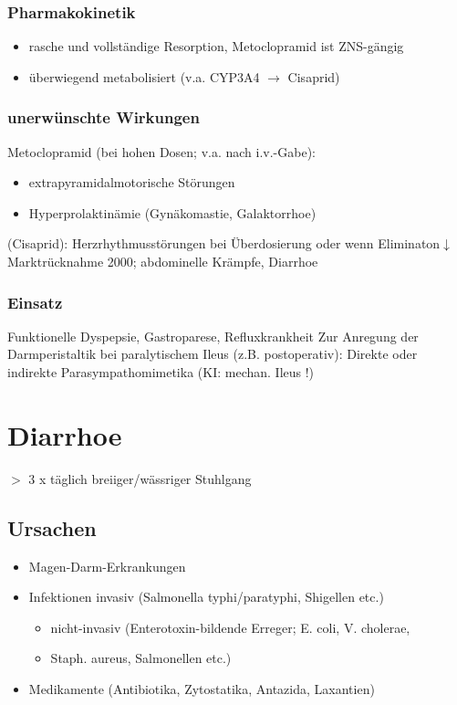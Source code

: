\documentclass[10pt,a4paper]{report}
\begin{document}
\subsubsection{Pharmakokinetik} %
\label{ssub:pharmakokinetik}
\begin{itemize}
	\item rasche und vollständige Resorption, Metoclopramid ist ZNS-gängig
	\item überwiegend metabolisiert (v.a. CYP3A4 $\rightarrow$ Cisaprid)
\end{itemize}
\subsubsection{unerwünschte Wirkungen} %
\label{ssub:unerw_nschte_wirkungen}
Metoclopramid (bei hohen Dosen; v.a. nach i.v.-Gabe): 
\begin{itemize}
	\item extrapyramidalmotorische Störungen
	\item Hyperprolaktinämie (Gynäkomastie, Galaktorrhoe)
\end{itemize}
(Cisaprid): Herzrhythmusstörungen bei Überdosierung oder wenn Eliminaton$\downarrow$
Marktrücknahme 2000; abdominelle Krämpfe, Diarrhoe  
\subsubsection{Einsatz} %
\label{ssub:einsatz}
Funktionelle Dyspepsie, Gastroparese, Refluxkrankheit
Zur Anregung der Darmperistaltik bei paralytischem Ileus (z.B. postoperativ): Direkte oder indirekte Parasympathomimetika (KI: mechan. Ileus !)
\section{Diarrhoe} %
\label{sec:diarrhoe}
$>$ 3 x täglich breiiger/wässriger Stuhlgang
\subsection{Ursachen} %
\label{sub:ursachen}
\begin{itemize}
	\item Magen-Darm-Erkrankungen
	\item Infektionen	invasiv 	(Salmonella typhi/paratyphi, Shigellen etc.)
	\begin{itemize}
		\item nicht-invasiv 	(Enterotoxin-bildende Erreger; E. coli, V. cholerae, 
		\item Staph. aureus, Salmonellen etc.)
	\end{itemize}
	\item Medikamente (Antibiotika, Zytostatika, Antazida, Laxantien)
\end{itemize}
\end{document}

